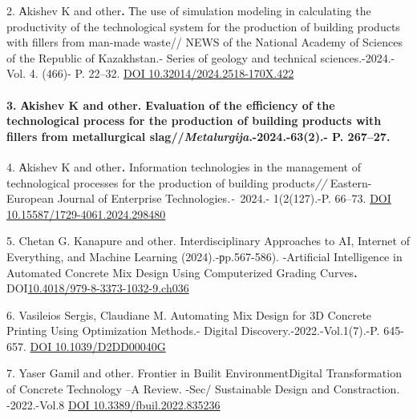\documentclass[
]{article}
\begin{document}
2. Аkishev K and other\textbf{.} Тhe use of simulation modeling in
calculating the productivity of the technological system for the
production of building products with fillers from man-made waste// NEWS
of the National Academy of Sciences of the Republic of Kazakhstan.-
Series of geology and technical sciences.-2024.-Vol. 4. (466)- P.
22--32. \href{https://doi.org/10.32014/2024.2518-170X.422}{DOI
10.32014/2024.2518-170X.422}

\paragraph{\texorpdfstring{3. Аkishev K and other. Еvaluation of the
efficiency of the technological process for the production of building
products with fillers from metallurgical
slag//\emph{Metalurgija}.-2024.-63(2).- P. 267--27.
}{3. Аkishev K and other. Еvaluation of the efficiency of the technological process for the production of building products with fillers from metallurgical slag//Metalurgija.-2024.-63(2).- P. 267--27. }}\label{ux430kishev-k-and-other.-ux435valuation-of-the-efficiency-of-the-technological-process-for-the-production-of-building-products-with-fillers-from-metallurgical-slagmetalurgija.-2024.-632.--p.-26727.}

4. Аkishev K and other\emph{\textbf{.}} Information technologies in the
management of technological processes for the production of building
products\emph{//} Eastern-European Journal of Enterprise
Technologies\emph{.-~}2024.- 1(2(127).-P. 66--73.
\href{https://doi.org/10.15587/1729-4061.2024.298480}{DOI
10.15587/1729-4061.2024.298480}

5. Chetan G. Kanapure and other. Interdisciplinary Approaches to AI,
Internet of Everything, and Machine Learning (2024).-рp.567-586).
-Artificial Intelligence in Automated Concrete Mix Design Using
Computerized Grading Curves\textbf{.}
DOI\href{http://dx.doi.org/10.4018/979-8-3373-1032-9.ch036}{10.4018/979-8-3373-1032-9.ch036}

6. Vasileios Sergis, Claudiane M. Automating Mix Design for 3D Concrete
Printing Using Optimization Methods.- Digital
Discovery.-2022.-Vol.1(7).-P. 645-657.
\href{https://doi.org/10.1039/D2DD00040G}{DOI 10.1039/D2DD00040G}

7. Yaser Gamil and other. Frontier in Builit EnvironmentDigital
Transformation of Concrete Technology --A Review. -Sec/ Sustainable
Design and Constraction. -2022.-Vol.8
\href{https://doi.org/10.3389/fbuil.2022.835236}{DOI
10.3389/fbuil.2022.835236}
\end{document}
